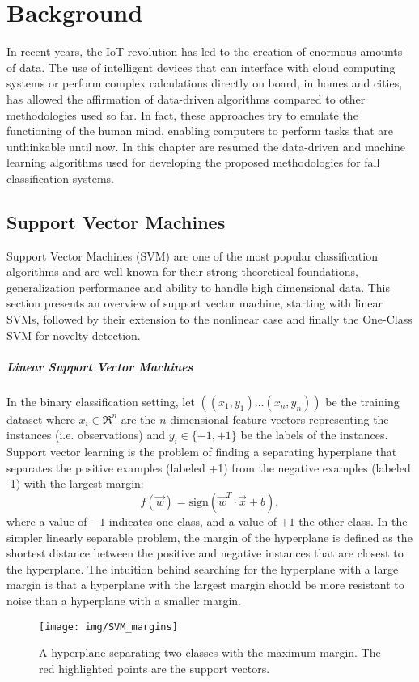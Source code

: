 \chapter{Background}\label{ch:backg}
In recent years, the IoT revolution has led to the creation of enormous amounts of data. The use of intelligent devices that can interface with cloud computing systems or perform complex calculations directly on board, in homes and cities, has allowed the affirmation of data-driven algorithms compared to other methodologies used so far. In fact, these approaches try to emulate the functioning of the human mind, enabling computers to perform tasks that are unthinkable until now. 
In this chapter are resumed the data-driven and machine learning algorithms used for developing the proposed methodologies for fall classification systems.

\section{Support Vector Machines}
Support Vector Machines (SVM) \cite{cortes95} are one of the most popular classification algorithms and are well known for their strong theoretical foundations, generalization performance and ability to handle high dimensional data.
This section presents an overview of support vector machine, starting with linear
SVMs, followed by their extension to the nonlinear case and finally the One-Class SVM for novelty detection.

\paragraph{Linear Support Vector Machines}
In the binary classification setting, let $((x_1, y_1)\dots(x_n, y_n))$ be the training dataset where $x_i \in \Re^n$ are the $n$-dimensional feature vectors representing the instances (i.e. observations) and  $y_i \in \{-1, +1\}$ be the labels of the instances. Support vector learning is the problem of finding a separating hyperplane that separates the positive examples (labeled +1) from the negative examples (labeled -1) with the largest margin:
\begin{equation}
f(\vec{w}) =  \mbox{sign} (\vec{w}^T \cdot \vec{x} + b),
\end{equation} 
where a value of $-1$ indicates one class, and a value of $+1$ the other class.
In the simpler linearly separable problem, the margin of the hyperplane is defined as the shortest distance between the positive and negative instances that are closest to the hyperplane. The intuition behind searching for the hyperplane with a large margin is that a hyperplane with the largest margin should be more resistant to noise than a hyperplane with a smaller margin.
\begin{figure}
	\centering
	\texttt{[image: img/SVM\_margins]}
	\caption{A hyperplane separating two classes with the maximum margin. The red highlighted points are the support vectors.
	}
	\label{fig:SVM_margins}
\end{figure} 

